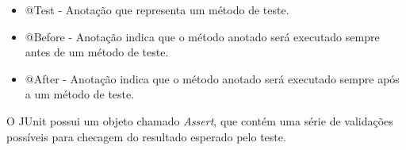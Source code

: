 \begin{itemize}
	\item @Test - Anotação que representa um método de teste.
	\item @Before - Anotação indica que o método anotado será executado sempre antes de um método de teste.
 	\item @After - Anotação indica que o método anotado será executado sempre após a um método de teste.
\end{itemize}

O JUnit possui um objeto chamado \textit{Assert}, que contém uma série de validações possíveis para checagem do resultado esperado pelo teste.
